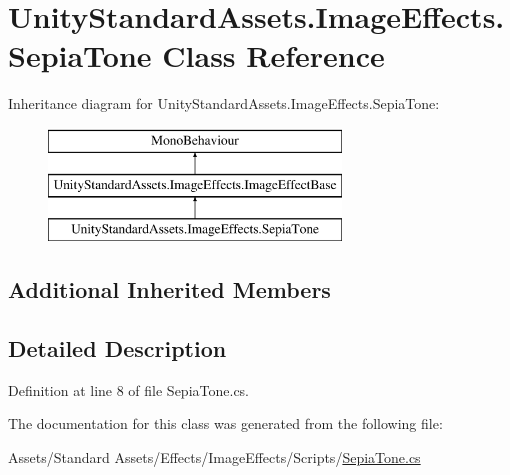 \hypertarget{class_unity_standard_assets_1_1_image_effects_1_1_sepia_tone}{}\section{Unity\+Standard\+Assets.\+Image\+Effects.\+Sepia\+Tone Class Reference}
\label{class_unity_standard_assets_1_1_image_effects_1_1_sepia_tone}
Inheritance diagram for Unity\+Standard\+Assets.\+Image\+Effects.\+Sepia\+Tone\+:\begin{figure}[H]
\begin{center}
\leavevmode
\includegraphics[height=3.000000cm]{class_unity_standard_assets_1_1_image_effects_1_1_sepia_tone}
\end{center}
\end{figure}
\subsection*{Additional Inherited Members}


\subsection{Detailed Description}


Definition at line 8 of file Sepia\+Tone.\+cs.



The documentation for this class was generated from the following file\+:\begin{DoxyCompactItemize}
\item 
Assets/\+Standard Assets/\+Effects/\+Image\+Effects/\+Scripts/\mbox{\hyperlink{_sepia_tone_8cs}{Sepia\+Tone.\+cs}}\end{DoxyCompactItemize}
